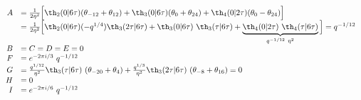 \begin{equation*}
  \begin{array}{rl}
A &= {1\over 2\eta^2}\Big[ \th_2(0|6\tau) (\theta_{-12} +
 \theta_{12}) + \th_3(0|6\tau) (\theta_{0} + \theta_{24}) + 
  \th_4(0|2\tau) (\theta_{0} -\theta_{24})\Big]\\ 
  &= {1\over 2\eta^2}\Big[ \th_2(0|6\tau)
 (-q^{1/4})\th_3(2\tau|6\tau)
 +\th_3(0|6\tau)~\th_3(\tau|6\tau)
 +\underbrace{\th_4(0|2\tau)~\th_4(\tau|6\tau)}_{q^{-1/12}~\eta^2} \Big] = q^{-1/12} \\
B &= C= D = E = 0\\
F &= e^{-2\pi i/3} ~q^{-1/12}\\
G &= {q^{1/12}\over \eta^2} \th_3(\tau|6\tau) ~(\theta_{-20} +
 \theta_{4}) + {q^{1/3}\over \eta^2} \th_3(2\tau|6\tau) ~(\theta_{-8} +
 \theta_{16}) = 0 \\
H &= 0 \\
I &=  e^{-2\pi i/6} ~q^{-1/12}\\
  \end{array}
\end{equation*}

